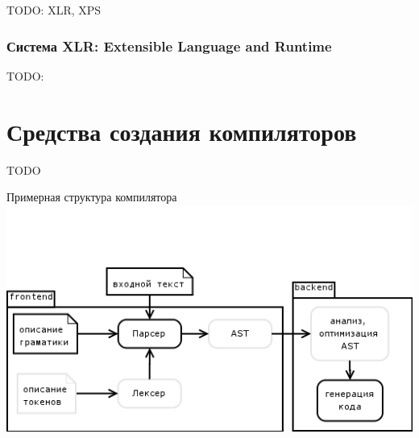 \documentclass[a4paper,12pt]{article}
\begin{document}
TODO: XLR, XPS

\subsubsection{Система XLR: Extensible Language and Runtime}
\label{xlr}
TODO:

\section{Средства создания компиляторов}
\label{tools}

TODO
\begin{center}
 Примерная структура компилятора
 \includegraphics[scale=0.6]{img/compiler.png}
\end{center}
\end{document}
